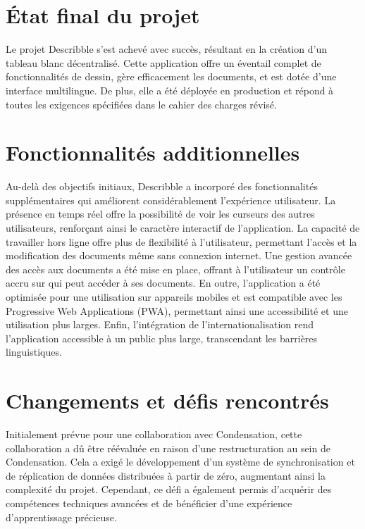 \section{État final du projet}

Le projet \Gls{Describble} s'est achevé avec succès, résultant en la création d'un tableau blanc décentralisé. Cette application offre un éventail complet de fonctionnalités de dessin, gère efficacement les documents, et est dotée d'une interface multilingue. De plus, elle a été déployée en production et répond à toutes les exigences spécifiées dans le cahier des charges révisé.

\section{Fonctionnalités additionnelles}

Au-delà des objectifs initiaux, \Gls{Describble} a incorporé des fonctionnalités supplémentaires qui améliorent considérablement l'expérience utilisateur. La présence en temps réel offre la possibilité de voir les curseurs des autres utilisateurs, renforçant ainsi le caractère interactif de l'application. La capacité de travailler hors ligne offre plus de flexibilité à l'utilisateur, permettant l'accès et la modification des documents même sans connexion internet. Une gestion avancée des accès aux documents a été mise en place, offrant à l'utilisateur un contrôle accru sur qui peut accéder à ses documents. En outre, l'application a été optimisée pour une utilisation sur appareils mobiles et est compatible avec les Progressive Web Applications (\Gls{PWA}), permettant ainsi une accessibilité et une utilisation plus larges. Enfin, l'intégration de l'internationalisation rend l'application accessible à un public plus large, transcendant les barrières linguistiques.

\section{Changements et défis rencontrés}

Initialement prévue pour une collaboration avec Condensation, cette collaboration a dû être réévaluée en raison d'une restructuration au sein de Condensation. Cela a exigé le développement d'un système de synchronisation et de réplication de données distribuées à partir de zéro, augmentant ainsi la complexité du projet. Cependant, ce défi a également permis d'acquérir des compétences techniques avancées et de bénéficier d'une expérience d'apprentissage précieuse.

